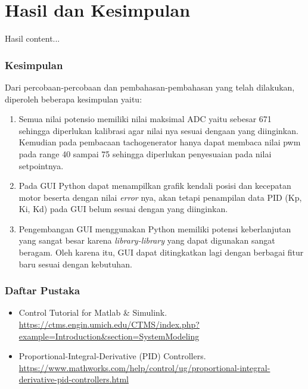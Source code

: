 \documentclass[10pt,xcolor={dvipsnames}]{beamer}
\begin{document}
	\section{Hasil dan Kesimpulan}
	\begin{frame}{Hasil}
		content...
	\end{frame}

		\begin{frame}
			\frametitle{Kesimpulan}
			Dari percobaan-percobaan dan pembahasan-pembahasan yang telah dilakukan, diperoleh beberapa kesimpulan yaitu:
			\begin{enumerate}
				\item Semua nilai potensio memiliki nilai maksimal ADC yaitu sebesar 671 sehingga diperlukan kalibrasi agar nilai nya sesuai dengaan yang diinginkan. Kemudian pada pembacaan tachogenerator hanya dapat membaca nilai pwm pada range 40 sampai 75 sehingga diperlukan penyesuaian pada nilai setpointnya. 
				\item Pada GUI Python dapat menampilkan grafik kendali posisi dan kecepatan motor beserta dengan nilai \textit{error} nya, akan tetapi penampilan data PID (Kp, Ki, Kd) pada GUI belum sesuai dengan yang diinginkan.
				\item Pengembangan GUI menggunakan Python memiliki potensi keberlanjutan yang sangat besar karena \textit{library-library} yang dapat digunakan sangat beragam. Oleh karena itu, GUI dapat ditingkatkan lagi dengan berbagai fitur baru sesuai dengan kebutuhan.
			\end{enumerate}
		\end{frame}
		
		\begin{frame}
			\frametitle{Daftar Pustaka}
			\begin{itemize}
				\item Control Tutorial for Matlab \& Simulink. \url{https://ctms.engin.umich.edu/CTMS/index.php?example=Introduction&section=SystemModeling}
				\item Proportional-Integral-Derivative (PID) Controllers. \url{https://www.mathworks.com/help/control/ug/proportional-integral-derivative-pid-controllers.html}
			\end{itemize}
		\end{frame}
		
		
\end{document}
